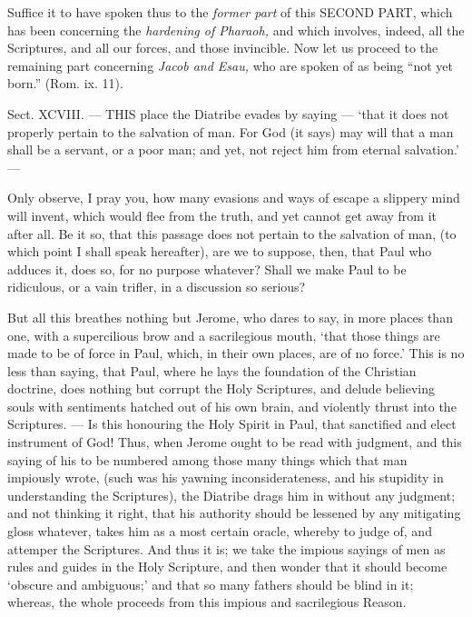 Suffice it to have spoken thus to the \emph{former part }of this \textsc{SECOND PART}, which has been concerning the \emph{hardening of Pharaoh, }and which involves, indeed, all the Scriptures, and all our forces, and those invincible. Now let us proceed to the remaining part concerning \emph{Jacob and Esau, }who are spoken of as being “not yet born.” (Rom. ix. 11).


Sect. XCVIII. — THIS place the Diatribe evades by saying — ‘that it does not properly pertain to the salvation of man. For God (it says) may will that a man shall be a servant, or a poor man; and yet, not reject him from eternal salvation.’ —

Only observe, I pray you, how many evasions and ways of escape a slippery mind will invent, which would flee from the truth, and yet cannot get away from it after all. Be it so, that this passage does not pertain to the salvation of man, (to which point I shall speak hereafter), are we to suppose, then, that Paul who adduces it, does so, for no purpose whatever? Shall we make Paul to be ridiculous, or a vain trifler, in a discussion so serious?

But all this breathes nothing but Jerome, who dares to say, in more places than one, with a supercilious brow and a sacrilegious mouth, ‘that those things are made to be of force in Paul, which, in their own places, are of no force.’ This is no less than saying, that Paul, where he lays the foundation of the Christian doctrine, does nothing but corrupt the Holy Scriptures, and delude believing souls with sentiments hatched out of his own brain, and violently thrust into the Scriptures. — Is this honouring the Holy Spirit in Paul, that sanctified and elect instrument of God! Thus, when Jerome ought to be read with judgment, and this saying of his to be numbered among those many things which that man impiously wrote, (such was his yawning inconsiderateness, and his stupidity in understanding the Scriptures), the Diatribe drags him in without any judgment; and not thinking it right, that his authority should be lessened by any mitigating gloss whatever, takes him as a most certain oracle, whereby to judge of, and attemper the Scriptures. And thus it is; we take the impious sayings of men as rules and guides in the Holy Scripture, and then wonder that it should become ‘obscure and ambiguous;’ and that so many fathers should be blind in it; whereas, the whole proceeds from this impious and sacrilegious Reason.

